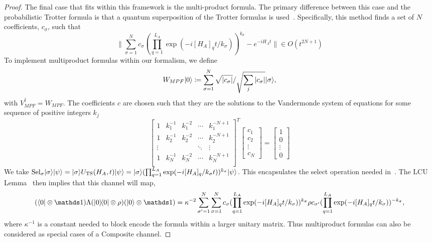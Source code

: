 \begin{proof}
The final case that fits within this framework is the multi-product formula.  The primary difference between this case and the probabilistic Trotter formula is that a quantum superposition of the Trotter formulas is used~\cite{childs2012hamiltonian,low2019well, faehrmann2021randomizing}.  
Specifically, this method finds a set of $N$ coefficients, $c_\sigma$, such that
\begin{equation}
\|\sum_{\sigma=1}^{N} c_\sigma  (\prod_{q=1}^{L_A} \exp(-i[H_A]_{q} t/k_{\sigma}))^{k_\sigma} - e^{-iH_A t}\| \in O(t^{2N+1})
\end{equation}
To implement multiproduct formulas within our formalism, we define $$W_{MPF}|0\rangle \coloneqq \sum_{\sigma =1}^{N} \sqrt{|c_\sigma|} / \sqrt{\sum_j |c_\sigma|} |\sigma\rangle,$$ with $V_{MPF}^\dagger= W_{MPF}$.  The coefficients $c$ are chosen such that they are the solutions to the Vandermonde system of equations for some sequence of positive integers $k_j$~\cite{childs2012hamiltonian}
\begin{equation}
\begin{bmatrix}
1 & k_1^{-1} & k_1^{-2} &\cdots & k_1^{-N+1}\\
1 & k_2^{-1} & k_2^{-2} &\cdots & k_2^{-N+1}\\
\vdots& & &\ddots &\vdots\\
1 & k_N^{-1} & k_N^{-2} &\cdots & k_N^{-N+1}\\
\end{bmatrix}^T \begin{bmatrix}
c_1 \\c_2 \\ \vdots \\c_N
\end{bmatrix}
=
\begin{bmatrix}
1 \\0 \\\vdots \\0
\end{bmatrix}
\end{equation}
We take
${\rm Sel}_\sigma|\sigma\rangle|\psi\rangle = |\sigma\rangle U_{\rm TS}(H_A,t) |\psi\rangle = |\sigma\rangle(\prod_{q=1}^{L_A} \exp(-i[H_A]_{q} /k_\sigma t))^{k_\sigma}|\psi\rangle$. This  encapsulates the select operation needed in~\cite{wiebe2010higher,low2019well}.  The LCU Lemma~\cite{childs2012hamiltonian,berry2015simulating} then implies that this channel will map, 
\begin{equation}
    (\bra{0}\otimes \openone)\Lambda(\ketbra{0}{0}\otimes \rho)(\ket{0}\otimes \openone) = \kappa^{-2}\sum_{\sigma' =1}^N\sum_{\sigma=1}^{N} c_\sigma  (\prod_{q=1}^{L_A} \exp(-i[H_A]_{q} t/k_{\sigma}))^{k_\sigma}\rho c_{\sigma'}  (\prod_{q=1}^{L_A} \exp(-i[H_A]_{q} t/k_{\sigma}))^{-k_\sigma},
\end{equation}
where $\kappa^{-1}$ is a constant needed to block encode the formula within a larger unitary matrix.  Thus multiproduct formulas can also be considered as special cases of a Composite channel.


\end{proof}
